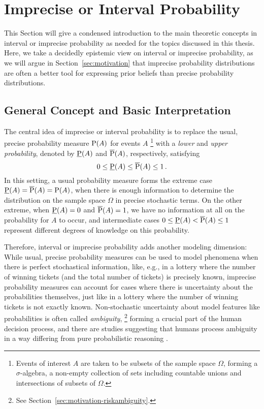 \newpage

\section{Imprecise or Interval Probability}
\label{sec:ip-intro}

This Section will give a condensed introduction to the main theoretic concepts
in interval or imprecise probability as needed for the topics discussed in this thesis.
Here, we take a decidedly epistemic view on interval or imprecise probability,
as we will argue in Section~\ref{sec:motivation}
that imprecise probability distributions are often a better tool for expressing prior beliefs
than precise probability distributions.



\subsection{General Concept and Basic Interpretation}
\label{sec:ip-general}

The central idea of imprecise or interval probability \parencite{1991:walley, 2001:weichselberger, 2011:IESS-ip} is
to replace the usual, precise probability measure $\operatorname{P}(A)$ for events $A$%
\footnote{Events of interest $A$ are taken to be subsets of the sample space $\Omega$,
forming a $\sigma$-algebra, a non-empty collection of sets including countable unions and intersections of subsets of $\Omega$.}
with a \emph{lower} and \emph{upper probability}, denoted by $\underline{\operatorname{P}}(A)$ and $\overline{\operatorname{P}}(A)$, respectively,
satisfying
\begin{equation}
\label{eq:0ip1}
0 \le \underline{\operatorname{P}}(A) \le \overline{\operatorname{P}}(A) \le 1\,.
\end{equation}
In this setting, a usual probability measure forms the extreme case $\underline{\operatorname{P}}(A) = \overline{\operatorname{P}}(A) = \operatorname{P}(A)$,
when there is enough information to determine the distribution on the sample space $\Omega$
in precise stochastic terms.
On the other extreme, when $\underline{\operatorname{P}}(A) = 0$ and $\overline{\operatorname{P}}(A) = 1$,
we have no information at all on the probability for $A$ to occur,
and intermediate cases $0 \le \underline{\operatorname{P}}(A) < \overline{\operatorname{P}}(A) \le 1$ represent
different degrees of knowledge on this probability.

Therefore, interval or imprecise probability adds another modeling dimension:
While usual, precise probability measures can be used to model phenomena when there is perfect stochastical information,
like, e.g., in a lottery where the number of winning tickets (and the total number of tickets) is precisely known,
imprecise probability measures can account for cases where there is uncertainty about the probabilities themselves,
just like in a lottery where the number of winning tickets is not exactly known.
Non-stochastic uncertainty about model features like probabilities is often called \emph{ambiguity},%
\footnote{See Section~\ref{sec:motivation-riskambiguity}.}
forming a crucial part of the human decision process,
and there are studies suggesting that humans process ambiguity in a way
differing from pure probabilistic reasoning \parencite{2005:hsu-bhatt}.

